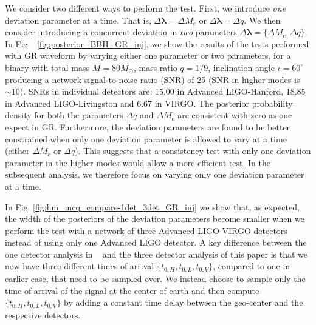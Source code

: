 \documentclass[prd,preprintnumbers,twocolumn,eqsecnum,floatfix,a4paper,nofootinbib,superscriptaddress]{revtex4}
\newcommand{\blambda}{\bm{\lambda}}
\begin{document}
We consider two different ways to perform the test. First, we introduce \emph{one} deviation parameter at a time. That is, $\Delta\blambda = {\Delta M_c}$ or $\Delta\blambda = {\Delta q}$. We then consider introducing a concurrent deviation in \emph{two} parameters $\Delta \blambda = \{\Delta M_c, \Delta q\}$. In Fig. 
~\ref{fig:posterior_BBH_GR_inj}, we show the results of the tests performed with GR waveform by varying either one parameter or two parameters, for a binary with total mass $M = 80M_{\odot}$, mass ratio $q=1/9$, inclination angle $ {\iota}=60^{\circ} $ producing a network signal-to-noise ratio  (SNR)  of 25 (SNR in higher modes is $\sim 10$). SNRs in individual detectors are: 15.00 in Advanced LIGO-Hanford, 18.85 in Advanced LIGO-Livingston and 6.67 in VIRGO. The posterior probability density for both the parameters $\Delta q$ and $\Delta M_c$ are consistent with zero as one expect in GR. Furthermore, the deviation parameters are found to be better constrained when only one deviation parameter is allowed to vary at a time (either $\Delta M_c$ or $\Delta q$). This suggests that a consistency test with only one deviation parameter in the higher modes would allow a more efficient test. In the subsequent analysis, we therefore focus on varying only one deviation parameter at a time. 

In Fig. \ref{fig:hm_mcq_compare-1det_3det_GR_inj} we show that, as expected, the width of the posteriors of the deviation parameters become smaller when we perform the test with a network of three Advanced LIGO-VIRGO detectors instead of using only one Advanced LIGO detector. A key difference between the one detector analysis in ~\cite{dhanpal2018} and the three detector analysis of this paper is that we now have three different times of arrival $\{ t_{0,H}, t_{0,L}, t_{0,V}\}$, compared to one in earlier case, that need to be sampled over. We instead choose to sample only the time of arrival of the signal at the center of earth and then compute $\{ t_{0,H}, t_{0,L}, t_{0,V}\}$ by adding a constant time delay between the geo-center and the respective detectors.
 
\end{document}

